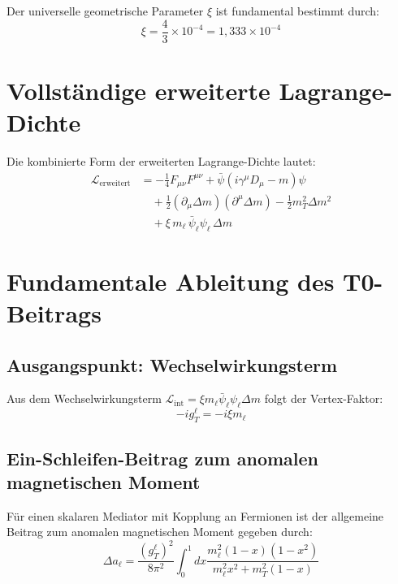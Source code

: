 \documentclass[12pt,a4paper]{article}
\theoremstyle{definition}
\begin{document}
	Der universelle geometrische Parameter $\xi$ ist fundamental bestimmt durch:
	\begin{equation}
		\xi = \frac{4}{3} \times 10^{-4} = 1,333 \times 10^{-4}
		\label{eq:xi_parameter}
	\end{equation}
	
	\section{Vollständige erweiterte Lagrange-Dichte}
	
	Die kombinierte Form der erweiterten Lagrange-Dichte lautet:
	\begin{align}
		\mathcal{L}_{\text{erweitert}} &= -\tfrac{1}{4} F_{\mu\nu}F^{\mu\nu} + \bar{\psi}(i\gamma^\mu D_\mu - m)\psi \nonumber\\
		&\quad + \tfrac{1}{2}(\partial_\mu \Delta m)(\partial^\mu \Delta m) - \tfrac{1}{2} m_T^2 \Delta m^2 \nonumber\\
		&\quad + \xi \, m_\ell \,\bar{\psi}_\ell \psi_\ell \, \Delta m
		\label{eq:extended_lagrangian}
	\end{align}
	
	\section{Fundamentale Ableitung des T0-Beitrags}
	
	\subsection{Ausgangspunkt: Wechselwirkungsterm}
	
	Aus dem Wechselwirkungsterm $\mathcal{L}_{\text{int}} = \xi m_\ell \bar{\psi}_\ell \psi_\ell \Delta m$ folgt der Vertex-Faktor:
	\begin{equation}
		-i g_T^\ell = -i \xi m_\ell
	\end{equation}
	
	\subsection{Ein-Schleifen-Beitrag zum anomalen magnetischen Moment}
	
	Für einen skalaren Mediator mit Kopplung an Fermionen ist der allgemeine Beitrag zum anomalen magnetischen Moment gegeben durch\cite{peskin_schroeder_1995}:
	\begin{equation}
		\Delta a_\ell = \frac{(g_T^\ell)^2}{8\pi^2} \int_0^1 dx \frac{m_\ell^2 (1-x)(1-x^2)}{m_\ell^2 x^2 + m_T^2 (1-x)}
		\label{eq:one_loop_general}
	\end{equation}
	
\end{document}
